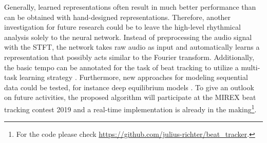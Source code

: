 \documentclass{scrartcl}
\begin{document}
Generally, learned representations often result in much better performance than can be obtained with hand-designed representations. Therefore, another investigation for future research could be to leave the high-level rhythmical analysis solely to the neural network. Instead of preprocessing the audio signal with the STFT, the network takes raw audio as input and automatically learns a representation that possibly acts similar to the Fourier transform. Additionally, the basic tempo can be annotated for the task of beat tracking to utilize a multi-task learning strategy \cite{Boeck2019}. Furthermore, new approaches for modeling sequential data could be tested, for instance deep equilibrium models \cite{Bai2019b}. To give an outlook on future activities, the proposed algorithm will participate at the MIREX beat tracking contest 2019 and a real-time implementation is already in the making\footnote{For the code please check \url{https://github.com/julius-richter/beat_tracker}.}.







\newpage 


\end{document}
